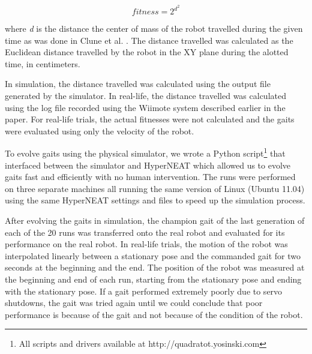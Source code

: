 \begin{equation}
fitness = 2^{d^{2}}
\end{equation}

where \emph{d} is the distance the center of mass of the robot travelled during the given time as was done in Clune et al. \cite{clune1}.
The distance travelled was calculated as the Euclidean distance travelled by the robot in the XY plane during the alotted time, in centimeters. 

In simulation, the distance travelled was calculated using the output file generated by the simulator.
In real-life, the distance travelled was calculated using the log file recorded using the Wiimote system described earlier in the paper. For real-life trials, the actual fitnesses were not calculated and the gaits were evaluated using only the velocity of the robot. 


To evolve gaits using the physical simulator, we wrote a Python script\footnote{All scripts and drivers available at http://quadratot.yosinski.com} that interfaced between the simulator and HyperNEAT which allowed us to evolve gaits fast and efficiently with no human intervention.
The runs were performed on three separate machines all running the same version of Linux (Ubuntu 11.04) using the same HyperNEAT settings and files to speed up the simulation process.


After evolving the gaits in simulation, the champion gait of the last generation of each of the 20 runs was transferred onto the real robot and evaluated for its performance on the real robot.
In real-life trials, the motion of the robot was interpolated linearly between a stationary pose and the commanded gait for two seconds at the beginning and the end. %
The position of the robot was measured at the beginning and end of each run, starting from the stationary pose and ending with the stationary pose. 
If a gait performed extremely poorly due to servo shutdowns, the gait was tried again until we could conclude that poor performance is because of the gait and not because of the condition of the robot.

